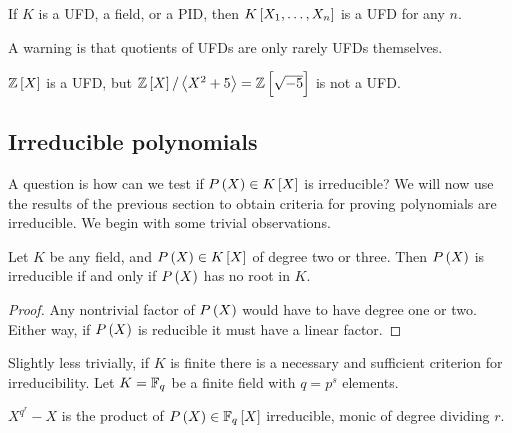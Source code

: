 \begin{corollary}
If $ K $ is a UFD, a field, or a PID, then $ K\sbr{X_1, \dots, X_n} $ is a UFD for any $ n $.
\end{corollary}

A warning is that quotients of UFDs are only rarely UFDs themselves.

\begin{example*}
$ \Z\sbr{X} $ is a UFD, but $ \Z\sbr{X} / \abr{X^2 + 5} = \Z\sbr{\sqrt{-5}} $ is not a UFD.
\end{example*}

\pagebreak

\subsection{Irreducible polynomials}


A question is how can we test if $ P\br{X} \in K\sbr{X} $ is irreducible? We will now use the results of the previous section to obtain criteria for proving polynomials are irreducible. We begin with some trivial observations.

\begin{lemma}
Let $ K $ be any field, and $ P\br{X} \in K\sbr{X} $ of degree two or three. Then $ P\br{X} $ is irreducible if and only if $ P\br{X} $ has no root in $ K $.
\end{lemma}

\begin{proof}
Any nontrivial factor of $ P\br{X} $ would have to have degree one or two. Either way, if $ P\br{X} $ is reducible it must have a linear factor.
\end{proof}

Slightly less trivially, if $ K $ is finite there is a necessary and sufficient
criterion for irreducibility. Let $ K = \mathbb{F}_q $ be a finite field with $ q = p^s $ elements.

\begin{lemma}
$ X^{q^r} - X $ is the product of $ P\br{X} \in \F_q\sbr{X} $ irreducible, monic of degree dividing $ r $.
\end{lemma}

